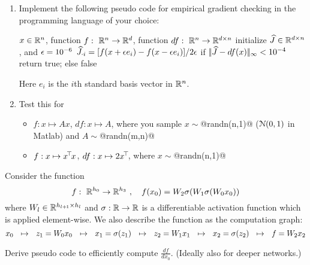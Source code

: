 \begin{enumerate}

\item Implement the following pseudo code for empirical gradient checking in
  the programming language of your choice:

\begin{algo}
\Require $x\in{\mathbb{R}}^n$, function $f:~ {\mathbb{R}}^n \to {\mathbb{R}}^d$, function
$df:~ {\mathbb{R}}^n \to {\mathbb{R}}^{d\times n}$
\State initialize $\widehat J \in {\mathbb{R}}^{d\times n}$, and $\epsilon=10^{-6}$
\State $\widehat J_{\cdot i} =  [f(x + \epsilon e_i) - f(x - \epsilon e_i)]/2\epsilon$
\EndFor
\State if $|\!|\widehat J - df(x)|\!|_\infty < 10^{-4}$ return true; else false
\end{algo}

Here $e_i$ is the $i$th standard basis vector in ${\mathbb{R}}^n$.

\item Test this for

\begin{itemize}
\item $f: x \mapsto A x$, $df: x \mapsto A$, where you sample $x\sim$@randn(n,1)@
(${\cal N}(0,1)$ in Matlab) and
$A\sim$@randn(m,n)@

\item $f: x\mapsto x^{\!\top\!} x$, $df: x \mapsto 2x^{\!\top\!}$, where $x\sim$@randn(n,1)@
\end{itemize}

\end{enumerate}





Consider the function
$$f:~ {\mathbb{R}}^{h_0} \to {\mathbb{R}}^{h_3} ~,\quad f(x_0) = W_2 \sigma( W_1 \sigma( W_0 x_0 )
)$$
where $W_l \in{\mathbb{R}}^{h_{l{{\hspace*{-.0pt}\text{\rm +}\hspace*{-.5pt}}1}}\times h_l}$ and $\sigma: {\mathbb{R}}\to{\mathbb{R}}$ is a differentiable activation function which is applied element-wise. We also describe the function as the computation graph:
$$
x_0 ~~\mapsto~~ z_1 = W_0 x_0 ~~\mapsto~~ x_1 = \sigma(z_1) ~~\mapsto~~
z_2 = W_1 x_1 ~~\mapsto~~ x_2 = \sigma(z_2) ~~\mapsto~~
f = W_2 x_2
$$

Derive pseudo code to efficiently compute $\frac{d f}{d x_0}$. (Ideally also for deeper networks.)


\exerfoot
